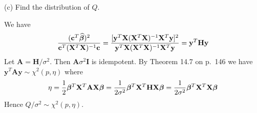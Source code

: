 \bigskip
\noindent
(c) Find the distribution of $Q$.

\bigskip
\noindent
We have
\[
{(\mathbf c^T\bm{\widehat\beta})^2
\over\mathbf c^T(\mathbf X^T\mathbf X)^{-1}\mathbf c}
=
{[\mathbf y^T\mathbf X(\mathbf X^T\mathbf X)^{-1}
\mathbf X^T\mathbf y]^2
\over\mathbf y^T\mathbf X(\mathbf X^T\mathbf X)^{-1}\mathbf X^T\mathbf y
}
=\mathbf y^T\mathbf{Hy}
\]
Let $\mathbf A=\mathbf H/\sigma^2$.
Then $\mathbf A\sigma^2\mathbf I$ is idempotent.
By Theorem 14.7 on p.\ 146 we have $\mathbf y^T\mathbf{Ay}
\sim\chi^2(p,\eta)$ where
\[
\eta={1\over2}\bm\beta^T\mathbf X^T\mathbf A\mathbf X\bm\beta
=
{1\over2\sigma^2}\bm\beta^T\mathbf X^T\mathbf{HX}\bm\beta
=
{1\over2\sigma^2}\bm\beta^T\mathbf X^T\mathbf X\bm\beta
\]
Hence $Q/\sigma^2\sim\chi^2(p,\eta)$.


